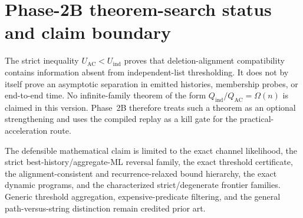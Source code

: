 \documentclass[11pt]{article}
\theoremstyle{remark}
\begin{document}
\section{Phase-2B theorem-search status and claim boundary}

The strict inequality $U_{\mathrm{AC}}<U_{\mathrm{ind}}$ proves that deletion-alignment
compatibility contains information absent from independent-list thresholding.  It does
not by itself prove an asymptotic separation in emitted histories, membership probes, or
end-to-end time.  No infinite-family theorem of the form
$Q_{\mathrm{ind}}/Q_{\mathrm{AC}}=\Omega(n)$ is claimed in this version.  Phase~2B
therefore treats such a theorem as an optional strengthening and uses the compiled replay
as a kill gate for the practical-acceleration route.

The defensible mathematical claim is limited to the exact channel likelihood, the strict
best-history/aggregate-ML reversal family, the exact threshold certificate, the
alignment-consistent and recurrence-relaxed bound hierarchy, the exact dynamic programs,
and the characterized strict/degenerate frontier families.  Generic threshold
aggregation, expensive-predicate filtering, and the general path-versus-string distinction
remain credited prior art.
\end{document}
